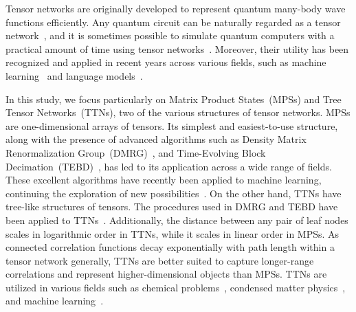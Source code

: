 \documentclass[12pt,dvipdfmx,twoside,openright]{report}
\begin{document}
Tensor networks are originally developed to represent quantum many-body wave functions efficiently.
Any quantum circuit can be naturally regarded as a tensor network~\cite{tn-qc}, and it is sometimes possible to simulate quantum computers with a practical amount of time using tensor networks~\cite{google-ibm}.
Moreover, their utility has been recognized and applied in recent years across various fields, such as machine learning~\cite{tnml} and language models~\cite{tnlanguage}.

In this study, we focus particularly on Matrix Product States~(MPSs) and Tree Tensor Networks~(TTNs), two of the various structures of tensor networks.
MPSs are one-dimensional arrays of tensors.
Its simplest and easiest-to-use structure, along with the presence of advanced algorithms such as Density Matrix Renormalization Group~(DMRG)~\cite{dmrg}, and Time-Evolving Block Decimation~(TEBD)~\cite{tebd}, has led to its application across a wide range of fields.
These excellent algorithms have recently been applied to machine learning, continuing the exploration of new possibilities~\cite{MPSsupervised,MPSgenerative}.
On the other hand, TTNs have tree-like structures of tensors.
The procedures used in DMRG and TEBD have been applied to TTNs~\cite{dmrg-ttn,tebd-ttn}.
Additionally, the distance between any pair of leaf nodes scales in logarithmic order in TTNs, while it scales in linear order in MPSs.
As connected correlation functions decay exponentially with path length within a tensor network generally, TTNs are better suited to capture longer-range correlations and represent higher-dimensional objects than MPSs.
TTNs are utilized in various fields such as chemical problems~\cite{chemical1,chemical2}, condensed matter physics~\cite{condmat1,condmat2,condmat3}, and machine learning~\cite{ml1,ml2}.
\end{document}
